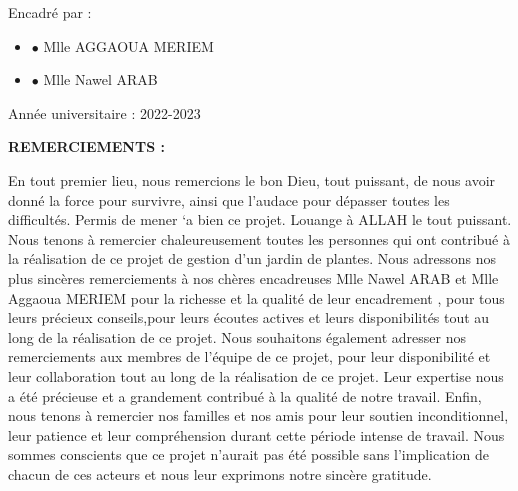 \documentclass[a4paper,12pt,oneside]{article}
\begin{document}
\begin{titlepage}
{\begin{itemize}
		\end{itemize}
		
		\vskip1cm
	
        Encadré par : \\
        \begin{itemize}
        \item[]
    		\begin{center}
         $\bullet$  Mlle AGGAOUA MERIEM
    		\end{center}
    		\item[]
    		\begin{center}
         $\bullet$  Mlle Nawel ARAB
    		\end{center}
    		\end{itemize}
        \vspace*{\fill} 
        \vfill
        Année universitaire : 2022-2023\\   
}
\end{titlepage}


\newpage
\begin{center}
{\bfseries\Large
{\Huge REMERCIEMENTS :}\\
}
\end{center}
\vskip1cm

{\fontsize{16}{20}\selectfont
En tout premier lieu, nous remercions le bon Dieu, tout puissant,
de nous avoir donné la force pour survivre, ainsi que l’audace
pour dépasser toutes les difficultés. Permis de mener `a bien ce
projet. Louange à ALLAH le tout puissant.
\vskip2mm
Nous tenons à remercier chaleureusement toutes les personnes qui ont contribué à la réalisation de ce projet de gestion d'un jardin de plantes.
\vskip2mm
Nous adressons nos plus sincères remerciements à nos chères
encadreuses Mlle Nawel ARAB et Mlle Aggaoua MERIEM pour la richesse et la qualité de leur encadrement , pour tous leurs précieux conseils,pour leurs écoutes actives et leurs disponibilités tout au long de la réalisation de ce projet.
\vskip2mm
Nous souhaitons également adresser nos remerciements aux membres de l'équipe de ce projet, pour leur disponibilité et leur collaboration tout au long de la réalisation de ce projet. Leur expertise nous a été précieuse et a grandement contribué à la qualité de notre travail.
\vskip2mm
Enfin, nous tenons à remercier nos familles et nos amis pour leur soutien inconditionnel, leur patience et leur compréhension durant cette période intense de travail.
\vskip2mm
Nous sommes conscients que ce projet n'aurait pas été possible sans l'implication de chacun de ces acteurs et nous leur exprimons notre sincère gratitude.
}
\end{document}
